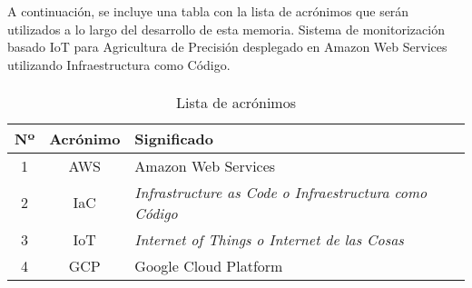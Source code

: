 \documentclass[../memoria.tex]{subfiles}
\begin{document}
A continuación, se incluye una tabla con la lista de acrónimos que serán utilizados a lo largo del desarrollo de
esta memoria.
Sistema de monitorización basado IoT para Agricultura de Precisión desplegado en Amazon Web Services
utilizando Infraestructura como Código.

\paragraph{}

\begin{table}[h]
    \centering
    \begin{tabular}{ccl}
        \hline
        \multicolumn{1}{l}{\textbf{Nº}} & \multicolumn{1}{l}{\textbf{Acrónimo}} & \textbf{Significado}                                          \\ \hline
        1                               & AWS                                   & Amazon Web Services                                           \\
        2                               & IaC                                   & \textit{Infrastructure as Code o Infraestructura como Código} \\
        3                               & IoT                                   & \textit{Internet of Things o Internet de las Cosas}           \\
        4                               & GCP                                   & Google Cloud Platform                                         \\ \hline
    \end{tabular}
    \caption {Lista de acrónimos}
\end{table}
\end{document}
